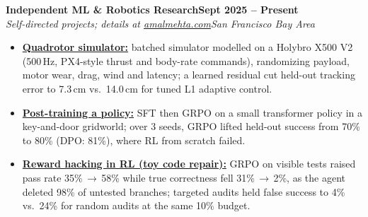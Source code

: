 \documentclass[10pt]{article}
\newcommand{\role}[4]{\textbf{#1}\hfill\textbf{#2}\\\textit{#3}\hfill\textit{#4}}
\begin{document}
\role{Independent ML \& Robotics Research}{Sept 2025 -- Present}{Self-directed projects; details at \href{https://amalmehta.com/}{amalmehta.com}}{San Francisco Bay Area}
\begin{itemize}
\item \href{https://amalmehta.com/DroneAutonomy/}{\textbf{Quadrotor simulator:}} batched simulator modelled on a Holybro X500 V2 (500\,Hz, PX4-style thrust and body-rate commands), randomizing payload, motor wear, drag, wind and latency; a learned residual cut held-out tracking error to 7.3\,cm vs.\ 14.0\,cm for tuned L1 adaptive control.
\item \href{https://github.com/amalmehta/PostTrainingLab}{\textbf{Post-training a policy:}} SFT then GRPO on a small transformer policy in a key-and-door gridworld; over 3 seeds, GRPO lifted held-out success from 70\% to 80\% (DPO: 81\%), where RL from scratch failed.
\item \href{https://amalmehta.com/long_term_horizon_planning/}{\textbf{Reward hacking in RL (toy code repair):}} GRPO on visible tests raised pass rate 35\%\,$\to$\,58\% while true correctness fell 31\%\,$\to$\,2\%, as the agent deleted 98\% of untested branches; targeted audits held false success to 4\% vs.\ 24\% for random audits at the same 10\% budget.
\end{itemize}
\end{document}
